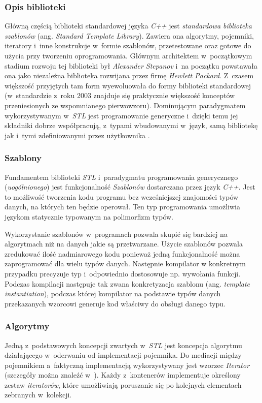       \subsubsection{Opis biblioteki}
      Główną częścią biblioteki standardowej języka \textit{C++} jest \textit{standardowa biblioteka szablonów} (ang. \textit{Standard Template Library}). Zawiera ona algorytmy, pojemniki, iteratory i~inne konstrukcje w~formie szablonów, przetestowane oraz gotowe do użycia przy tworzeniu oprogramowania. Głównym architektem w~początkowym stadium rozwoju tej biblioteki był \textit{Alexander Stepanov} i~na początku powstawała ona jako niezależna biblioteka rozwijana przez firmę \textit{Hewlett Packard}. Z~czasem większość przyjętych tam form wyewoluowała do formy biblioteki standardowej (w~standardzie z~roku 2003 znajduje się praktycznie większość konceptów przeniesionych ze wspomnianego pierwowzoru). Dominującym paradygmatem wykorzystywanym w~\textit{STL} jest programowanie generyczne i~dzięki temu jej składniki dobrze współpracują, z~typami wbudowanymi w~język, samą bibliotekę jak i~tymi zdefiniowanymi przez użytkownika \cite{StlJosuttis}.

      \subsubsection{Szablony}
      Fundamentem biblioteki \textit{STL} i~paradygmatu programowania generycznego (\textit{uogólnionego}) jest funkcjonalność \textit{Szablonów} dostarczana przez język \textit{C++}. Jest to możliwość tworzenia kodu programu bez wcześniejszej znajomości typów danych, na których ten będzie operował. Ten typ programowania umożliwia językom statycznie typowanym na polimorfizm typów.

      Wykorzystanie szablonów w~programach pozwala skupić się bardziej na algorytmach niż na danych jakie są przetwarzane. Użycie szablonów pozwala zredukować ilość nadmiarowego kodu ponieważ jedną funkcjonalność można zaprogramować dla wielu typów danych. Następnie kompilator w konkretnym przypadku precyzuje typ i~odpowiednio dostosowuje np. wywołania funkcji. Podczas kompilacji następuje tak zwana konkretyzacja szablonu (ang. \textit{template instantiation}), podczas której kompilator na podstawie typów danych przekazanych wzorcowi generuje kod właściwy do obsługi danego typu.

      \subsubsection{Algorytmy}
      Jedną z~podstawowych koncepcji zwartych w~\textit{STL} jest koncepcja algorytmu działającego w~oderwaniu od implementacji pojemnika. Do mediacji między pojemnikiem a~faktyczną implementacją wykorzystywany jest wzorzec \textit{Iterator} (szczegóły można znaleźć w~\cite{PatternsGoF}). Każdy z~kontenerów implementuje określony zestaw \textit{iteratorów}, które umożliwiają poruszanie się po kolejnych elementach zebranych w~kolekcji.

